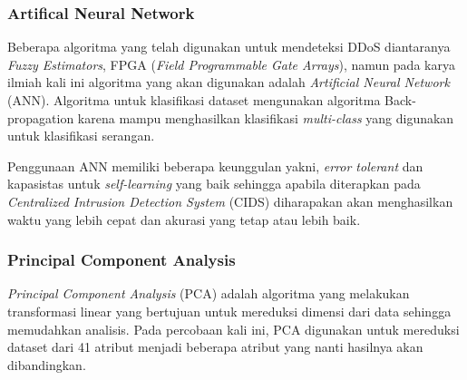 \subsubsection{Artifical Neural Network}
    Beberapa algoritma yang telah digunakan untuk mendeteksi DDoS diantaranya \textit{Fuzzy Estimators}, FPGA (\textit{Field Programmable Gate Arrays}), namun pada karya ilmiah kali ini algoritma yang akan digunakan adalah \textit{Artificial Neural Network} (ANN). Algoritma untuk klasifikasi dataset mengunakan algoritma Back-propagation karena mampu menghasilkan klasifikasi \textit{multi-class}\cite{fiturPCA} yang digunakan untuk klasifikasi serangan.
    
    Penggunaan ANN memiliki beberapa keunggulan yakni, \textit{error tolerant} dan kapasistas untuk \textit{self-learning} yang baik\cite{ann_advantages} sehingga apabila diterapkan pada \textit{Centralized Intrusion Detection System} (CIDS) diharapakan akan menghasilkan waktu yang lebih cepat dan akurasi yang tetap atau lebih baik.
    
\subsubsection{Principal Component Analysis}

\textit{Principal Component Analysis} (PCA) adalah algoritma yang melakukan transformasi linear yang bertujuan untuk mereduksi dimensi dari data sehingga memudahkan analisis\cite{wallisch_principal_2014}. Pada percobaan kali ini, PCA digunakan untuk mereduksi dataset dari 41 atribut menjadi beberapa atribut yang nanti hasilnya akan dibandingkan.

